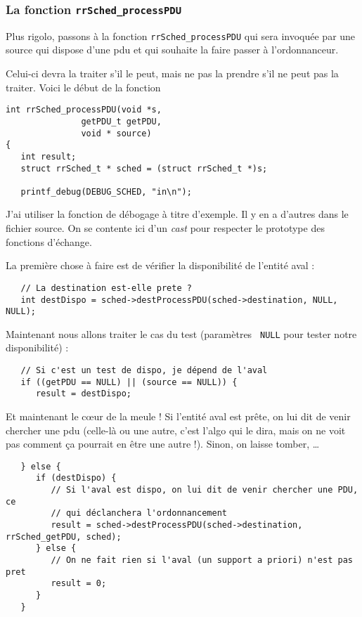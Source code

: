 %
\subsubsection{La fonction {\tt rrSched\_processPDU}}

   Plus rigolo, passons à la fonction {\tt rrSched\_processPDU} qui
sera invoquée par une source qui dispose d'une {\sc pdu} et qui
souhaite la faire passer à l'ordonnanceur.

   Celui-ci devra la traiter s'il le peut, mais ne pas la prendre s'il
ne peut pas la traiter. Voici le début de la fonction

\begin{verbatim}
int rrSched_processPDU(void *s,
		       getPDU_t getPDU,
		       void * source)
{
   int result;
   struct rrSched_t * sched = (struct rrSched_t *)s;

   printf_debug(DEBUG_SCHED, "in\n");
\end{verbatim}

   J'ai utiliser la fonction de débogage à titre d'exemple. Il y en a
d'autres dans le fichier source. On se contente ici d'un {\em cast}
pour respecter le prototype des fonctions d'échange.

   La première chose à faire est de vérifier la disponibilité de
l'entité aval :

\begin{verbatim}
   // La destination est-elle prete ?
   int destDispo = sched->destProcessPDU(sched->destination, NULL, NULL);
\end{verbatim}

   Maintenant nous allons traiter le cas du test (paramètres {\tt
NULL} pour tester notre disponibilité) :

\begin{verbatim}
   // Si c'est un test de dispo, je dépend de l'aval
   if ((getPDU == NULL) || (source == NULL)) {
      result = destDispo;
\end{verbatim}

   Et maintenant le c\oe{}ur de la meule ! Si l'entité aval est prête,
on lui dit de venir chercher une {\sc pdu} (celle-là ou une autre,
c'est l'algo qui le dira, mais on ne voit pas comment ça pourrait en
être une autre !). Sinon, on laisse tomber, \ldots

\begin{verbatim}
   } else {
      if (destDispo) {
         // Si l'aval est dispo, on lui dit de venir chercher une PDU, ce
         // qui déclanchera l'ordonnancement
         result = sched->destProcessPDU(sched->destination, rrSched_getPDU, sched);
      } else {
         // On ne fait rien si l'aval (un support a priori) n'est pas pret
         result = 0;
      }
   }
\end{verbatim}

